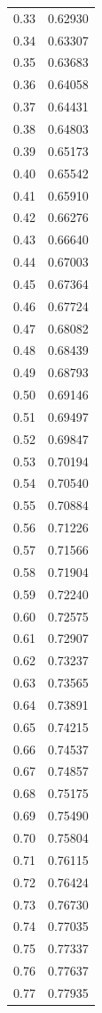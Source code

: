 \documentclass[
  letterpaper,
  DIV=11,
  numbers=noendperiod]{scrartcl}
\begin{document}
\begin{longtable}[]{@{}cc@{}}
0.33 & 0.62930 \\
0.34 & 0.63307 \\
0.35 & 0.63683 \\
0.36 & 0.64058 \\
0.37 & 0.64431 \\
0.38 & 0.64803 \\
0.39 & 0.65173 \\
0.40 & 0.65542 \\
0.41 & 0.65910 \\
0.42 & 0.66276 \\
0.43 & 0.66640 \\
0.44 & 0.67003 \\
0.45 & 0.67364 \\
0.46 & 0.67724 \\
0.47 & 0.68082 \\
0.48 & 0.68439 \\
0.49 & 0.68793 \\
0.50 & 0.69146 \\
0.51 & 0.69497 \\
0.52 & 0.69847 \\
0.53 & 0.70194 \\
0.54 & 0.70540 \\
0.55 & 0.70884 \\
0.56 & 0.71226 \\
0.57 & 0.71566 \\
0.58 & 0.71904 \\
0.59 & 0.72240 \\
0.60 & 0.72575 \\
0.61 & 0.72907 \\
0.62 & 0.73237 \\
0.63 & 0.73565 \\
0.64 & 0.73891 \\
0.65 & 0.74215 \\
0.66 & 0.74537 \\
0.67 & 0.74857 \\
0.68 & 0.75175 \\
0.69 & 0.75490 \\
0.70 & 0.75804 \\
0.71 & 0.76115 \\
0.72 & 0.76424 \\
0.73 & 0.76730 \\
0.74 & 0.77035 \\
0.75 & 0.77337 \\
0.76 & 0.77637 \\
0.77 & 0.77935 \\

\end{longtable}
\end{document}
